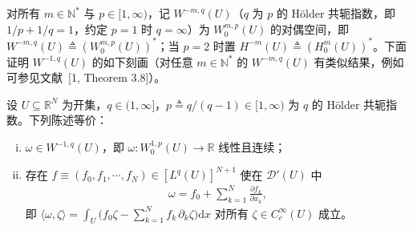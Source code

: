 \documentclass[../../main.tex]{subfiles}%
\begin{document}
对所有 $m\in\mathbb{N}^*$ 与 $p\in[1,\infty)$，记 $W^{-m,q}(U)$（$q$ 为 $p$ 的 Hölder 共轭指数，即 $1/p+1/q=1$，约定 $p=1$ 时 $q=\infty$）为 $W^{m,p}_0(U)$ 的对偶空间，即 $W^{-m,q}(U)\triangleq(W^{m,p}_0(U))^*$；当 $p=2$ 时置 $H^{-m}(U)\triangleq(H^m_0(U))^*$。下面证明 $W^{-1,q}(U)$ 的如下刻画（对任意 $m\in\mathbb{N}^*$ 的 $W^{-m,q}(U)$ 有类似结果，例如可参见文献~[1, Theorem 3.8]）。

\begin{proposition}\label{proposition:ch03-W-1q刻画}

设 $U\subseteq\mathbb{R}^N$ 为开集，$q\in(1,\infty]$，$p\triangleq q/(q-1)\in[1,\infty)$ 为 $q$ 的 Hölder 共轭指数。下列陈述等价：
\begin{enumerate}[(i)]
\item $\omega\in W^{-1,q}(U)$，即 $\omega:W^{1,p}_0(U)\to\mathbb{R}$ 线性且连续；
\item 存在 $f\equiv(f_0,f_1,\cdots ,f_N)\in[L^q(U)]^{N+1}$ 使在 $\mathcal{D}'(U)$ 中
\begin{align*}
\omega=f_0+\sum_{k=1}^N\frac{\partial f_k}{\partial x_k},
\end{align*}
即 $\langle\omega,\zeta\rangle=\int_U\big(f_0\zeta-\sum_{k=1}^Nf_k\,\partial_k\zeta\big)\mathrm{d}x$ 对所有 $\zeta\in C^\infty_c(U)$ 成立。
\end{enumerate}
\end{proposition}
\end{document}
